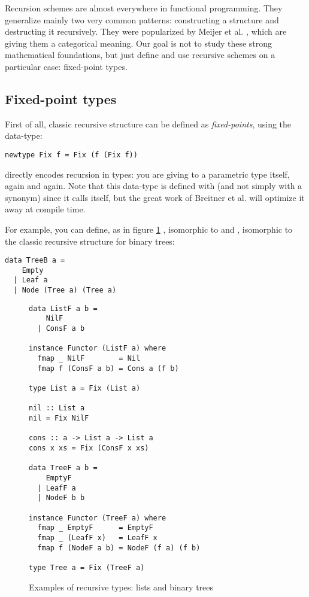 
Recursion schemes are almost everywhere in functional programming. They generalize mainly two very common patterns: constructing a structure and destructing it recursively. They were popularized by Meijer et al. \cite{4cec4a43c86444479dc0003182424795}, which are giving them a categorical meaning. Our goal is not to study these strong mathematical foundations, but just define and use recursive schemes on a particular case: fixed-point types.

\subsection{Fixed-point types}
\label{subsec:defi}
First of all, classic recursive structure can be defined as \emph{fixed-points}, using the  data-type:
\begin{verbatim}
newtype Fix f = Fix (f (Fix f))
\end{verbatim}
 directly encodes recursion in types: you are giving to a parametric type itself, again and again. Note that this data-type is defined with  (and not simply with a  synonym) since it calls itself, but the great work of Breitner et al. \cite{Breitner:2014:SZC:2692915.2628141} will optimize it away at compile time.

For example, you can define, as in figure \ref{fig:listtree}
, isomorphic to \hs{[a]} and , isomorphic to the classic recursive structure for binary trees:
\begin{verbatim}
data TreeB a =
    Empty
  | Leaf a
  | Node (Tree a) (Tree a)
\end{verbatim}

\begin{figure}
\begin{verbatim}
data ListF a b =
    NilF
  | ConsF a b

instance Functor (ListF a) where
  fmap _ NilF        = Nil
  fmap f (ConsF a b) = Cons a (f b)

type List a = Fix (List a)

nil :: List a
nil = Fix NilF

cons :: a -> List a -> List a
cons x xs = Fix (ConsF x xs)

data TreeF a b =
    EmptyF
  | LeafF a
  | NodeF b b

instance Functor (TreeF a) where
  fmap _ EmptyF      = EmptyF
  fmap _ (LeafF x)   = LeafF x
  fmap f (NodeF a b) = NodeF (f a) (f b)

type Tree a = Fix (TreeF a)
\end{verbatim}
\caption{Examples of recursive types: lists and binary trees}
\label{fig:listtree}
\end{figure}

